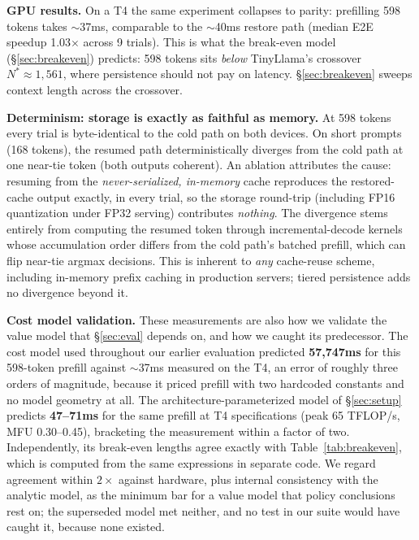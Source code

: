 \documentclass[letterpaper,twocolumn,10pt]{article}
\begin{document}
\textbf{GPU results.} On a T4 the same experiment collapses to parity: prefilling 598 tokens takes ${\sim}$37ms, comparable to the ${\sim}$40ms restore path (median E2E speedup 1.03$\times$ across 9 trials). This is what the break-even model (\S\ref{sec:breakeven}) predicts: 598 tokens sits \emph{below} TinyLlama's crossover $N^{*}{\approx}1{,}561$, where persistence should not pay on latency. \S\ref{sec:breakeven} sweeps context length across the crossover.

\textbf{Determinism: storage is exactly as faithful as memory.} At 598 tokens every trial is byte-identical to the cold path on both devices. On short prompts (168 tokens), the resumed path deterministically diverges from the cold path at one near-tie token (both outputs coherent). An ablation attributes the cause: resuming from the \emph{never-serialized, in-memory} cache reproduces the restored-cache output exactly, in every trial, so the storage round-trip (including FP16 quantization under FP32 serving) contributes \emph{nothing}. The divergence stems entirely from computing the resumed token through incremental-decode kernels whose accumulation order differs from the cold path's batched prefill, which can flip near-tie argmax decisions. This is inherent to \emph{any} cache-reuse scheme, including in-memory prefix caching in production servers; tiered persistence adds no divergence beyond it.

\textbf{Cost model validation.} These measurements are also how we validate the value model that \S\ref{sec:eval} depends on, and how we caught its predecessor. The cost model used throughout our earlier evaluation predicted \textbf{57,747ms} for this 598-token prefill against ${\sim}$37ms measured on the T4, an error of roughly three orders of magnitude, because it priced prefill with two hardcoded constants and no model geometry at all. The architecture-parameterized model of \S\ref{sec:setup} predicts \textbf{47--71ms} for the same prefill at T4 specifications (peak 65 TFLOP/s, MFU 0.30--0.45), bracketing the measurement within a factor of two. Independently, its break-even lengths agree exactly with Table~\ref{tab:breakeven}, which is computed from the same expressions in separate code. We regard agreement within $2\times$ against hardware, plus internal consistency with the analytic model, as the minimum bar for a value model that policy conclusions rest on; the superseded model met neither, and no test in our suite would have caught it, because none existed.

\end{document}
